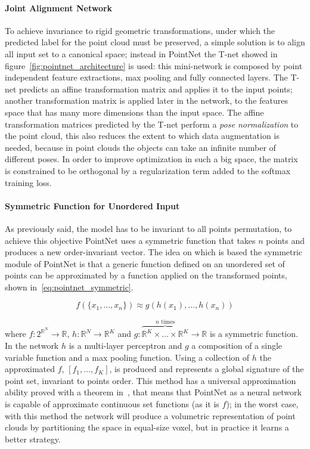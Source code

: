 \paragraph{Joint Alignment Network}

To achieve invariance to rigid geometric transformations, under which the predicted label for the point cloud must be preserved, a simple solution is to align all input set to a canonical space; instead in PointNet the T-net showed in figure~\ref{fig:pointnet_architecture} is used: this mini-network is composed by point independent feature extractions, max pooling and fully connected layers. The T-net predicts an affine transformation matrix and applies it to the input points; another transformation matrix is applied later in the network, to the features space that has many more dimensions than the input space. The affine transformation matrices predicted by the T-net perform a \textit{pose normalization} to the point cloud, this also reduces the extent to which data augmentation is needed, because in point clouds the objects can take an infinite number of different poses. In order to improve optimization in such a big space, the matrix is constrained to be orthogonal by a regularization term added to the softmax training loss.

\paragraph{Symmetric Function for Unordered Input}

As previously said, the model has to be invariant to all points permutation, to achieve this objective PointNet uses a symmetric function that takes $n$ points and produces a new order-invariant vector. The idea on which is based the symmetric module of PointNet is that a generic function defined on an unordered set of points can be approximated by a function applied on the transformed points, shown in~\ref{eq:pointnet_symmetric}.

\begin{equation}
\label{eq:pointnet_symmetric}
    f(\{x_1, \dots ,x_n\}) \approx g(h(x_1), \dots , h(x_n))
\end{equation}

where $f : 2^{\mathbb{R}^N} \to \mathbb{R}$, $h: \mathbb{R}^N \to \mathbb{R}^K$ and $g: \overbrace{\mathbb{R}^K \times \dots \times \mathbb{R}^K}^{n \text{ times}} \to \mathbb{R}$ is a symmetric function. In the network $h$ is a multi-layer perceptron and $g$ a composition of a single variable function and a max pooling function. Using a collection of $h$ the approximated $f$, $[f_1, \dots, f_K]$, is produced and represents a global signature of the point set, invariant to points order. This method has a universal approximation ability proved with a theorem in~\cite{qi2017pointnet}, that means that PointNet as a neural network is capable of approximate continuous set functions (as it is $f$); in the worst case, with this method the network will produce a volumetric representation of point clouds by partitioning the space in equal-size voxel, but in practice it learns a better strategy.

